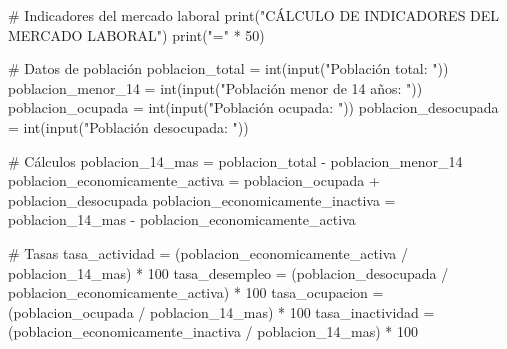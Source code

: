 \documentclass[
  doc,
  floatsintext,
  longtable,
  a4paper,
  nolmodern,
  notxfonts,
  notimes,
  12pt,
  colorlinks=true,linkcolor=blue,citecolor=blue,urlcolor=blue]{apa7}
\newenvironment{Shaded}{\begin{snugshade}}{\end{snugshade}}
\newcommand{\BuiltInTok}[1]{\textcolor[rgb]{0.00,0.23,0.31}{#1}}
\newcommand{\CommentTok}[1]{\textcolor[rgb]{0.37,0.37,0.37}{#1}}
\newcommand{\DecValTok}[1]{\textcolor[rgb]{0.68,0.00,0.00}{#1}}
\newcommand{\NormalTok}[1]{\textcolor[rgb]{0.00,0.23,0.31}{#1}}
\newcommand{\OperatorTok}[1]{\textcolor[rgb]{0.37,0.37,0.37}{#1}}
\newcommand{\StringTok}[1]{\textcolor[rgb]{0.13,0.47,0.30}{#1}}
\begin{document}
\begin{Shaded}
\begin{Highlighting}[]
\CommentTok{\# Indicadores del mercado laboral}
\BuiltInTok{print}\NormalTok{(}\StringTok{"CÁLCULO DE INDICADORES DEL MERCADO LABORAL"}\NormalTok{)}
\BuiltInTok{print}\NormalTok{(}\StringTok{"="} \OperatorTok{*} \DecValTok{50}\NormalTok{)}

\CommentTok{\# Datos de población}
\NormalTok{poblacion\_total }\OperatorTok{=} \BuiltInTok{int}\NormalTok{(}\BuiltInTok{input}\NormalTok{(}\StringTok{"Población total: "}\NormalTok{))}
\NormalTok{poblacion\_menor\_14 }\OperatorTok{=} \BuiltInTok{int}\NormalTok{(}\BuiltInTok{input}\NormalTok{(}\StringTok{"Población menor de 14 años: "}\NormalTok{))}
\NormalTok{poblacion\_ocupada }\OperatorTok{=} \BuiltInTok{int}\NormalTok{(}\BuiltInTok{input}\NormalTok{(}\StringTok{"Población ocupada: "}\NormalTok{))}
\NormalTok{poblacion\_desocupada }\OperatorTok{=} \BuiltInTok{int}\NormalTok{(}\BuiltInTok{input}\NormalTok{(}\StringTok{"Población desocupada: "}\NormalTok{))}

\CommentTok{\# Cálculos}
\NormalTok{poblacion\_14\_mas }\OperatorTok{=}\NormalTok{ poblacion\_total }\OperatorTok{{-}}\NormalTok{ poblacion\_menor\_14}
\NormalTok{poblacion\_economicamente\_activa }\OperatorTok{=}\NormalTok{ poblacion\_ocupada }\OperatorTok{+}\NormalTok{ poblacion\_desocupada}
\NormalTok{poblacion\_economicamente\_inactiva }\OperatorTok{=}\NormalTok{ poblacion\_14\_mas }\OperatorTok{{-}}\NormalTok{ poblacion\_economicamente\_activa}

\CommentTok{\# Tasas}
\NormalTok{tasa\_actividad }\OperatorTok{=}\NormalTok{ (poblacion\_economicamente\_activa }\OperatorTok{/}\NormalTok{ poblacion\_14\_mas) }\OperatorTok{*} \DecValTok{100}
\NormalTok{tasa\_desempleo }\OperatorTok{=}\NormalTok{ (poblacion\_desocupada }\OperatorTok{/}\NormalTok{ poblacion\_economicamente\_activa) }\OperatorTok{*} \DecValTok{100}
\NormalTok{tasa\_ocupacion }\OperatorTok{=}\NormalTok{ (poblacion\_ocupada }\OperatorTok{/}\NormalTok{ poblacion\_14\_mas) }\OperatorTok{*} \DecValTok{100}
\NormalTok{tasa\_inactividad }\OperatorTok{=}\NormalTok{ (poblacion\_economicamente\_inactiva }\OperatorTok{/}\NormalTok{ poblacion\_14\_mas) }\OperatorTok{*} \DecValTok{100}


\end{Highlighting}
\end{Shaded}
\end{document}
